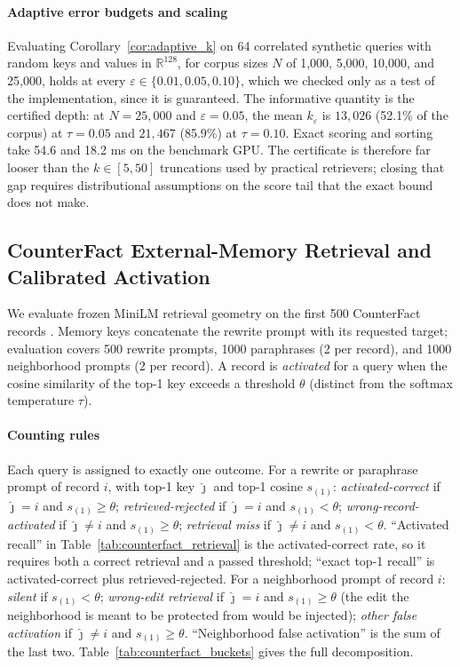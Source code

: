 \documentclass[preprint,12pt]{elsarticle}
\newcommand{\R}{\mathbb{R}}
\newif\ifmarkchanges
\newcommand{\rev}[1]{\ifmarkchanges{\color{blue}#1}\else#1\fi}
\begin{document}
\paragraph{Adaptive error budgets and scaling}
Evaluating Corollary~\ref{cor:adaptive_k} on 64 correlated synthetic queries with random keys and values in $\R^{128}$, for corpus sizes $N$ of 1,000, 5,000, 10,000, and 25,000, \rev{holds at every $\varepsilon \in \{0.01, 0.05, 0.10\}$, which we checked only as a test of the implementation, since it is guaranteed.} The informative quantity is the certified depth: at $N=25{,}000$ and $\varepsilon=0.05$, the mean $k_\varepsilon$ is $13{,}026$ (52.1\% of the corpus) at $\tau=0.05$ and $21{,}467$ (85.9\%) at $\tau=0.10$. Exact scoring and sorting take 54.6 and 18.2 ms on the benchmark GPU. The certificate is therefore far looser than the $k\in[5,50]$ truncations used by practical retrievers; closing that gap requires distributional assumptions on the score tail that the exact bound does not make.

\subsection{CounterFact External-Memory Retrieval and Calibrated Activation}
\label{sec:counterfact}

We evaluate frozen MiniLM retrieval geometry on the first 500 CounterFact records \cite{meng2022locating}. Memory keys concatenate the rewrite prompt with its requested target; evaluation covers 500 rewrite prompts, 1000 paraphrases (2 per record), and 1000 neighborhood prompts (2 per record). A record is \emph{activated} for a query when the cosine similarity of the top-1 key exceeds a threshold $\theta$ (distinct from the softmax temperature $\tau$).

\paragraph{Counting rules}
\rev{Each query is assigned to exactly one outcome. For a rewrite or paraphrase prompt of record $i$, with top-1 key $\hat\jmath$ and top-1 cosine $s_{(1)}$: \emph{activated-correct} if $\hat\jmath=i$ and $s_{(1)}\ge\theta$; \emph{retrieved-rejected} if $\hat\jmath=i$ and $s_{(1)}<\theta$; \emph{wrong-record-activated} if $\hat\jmath\ne i$ and $s_{(1)}\ge\theta$; \emph{retrieval miss} if $\hat\jmath\ne i$ and $s_{(1)}<\theta$. ``Activated recall'' in Table~\ref{tab:counterfact_retrieval} is the activated-correct rate, so it requires both a correct retrieval and a passed threshold; ``exact top-1 recall'' is activated-correct plus retrieved-rejected. For a neighborhood prompt of record $i$: \emph{silent} if $s_{(1)}<\theta$; \emph{wrong-edit retrieval} if $\hat\jmath=i$ and $s_{(1)}\ge\theta$ (the edit the neighborhood is meant to be protected from would be injected); \emph{other false activation} if $\hat\jmath\ne i$ and $s_{(1)}\ge\theta$. ``Neighborhood false activation'' is the sum of the last two. Table~\ref{tab:counterfact_buckets} gives the full decomposition.}
\end{document}

